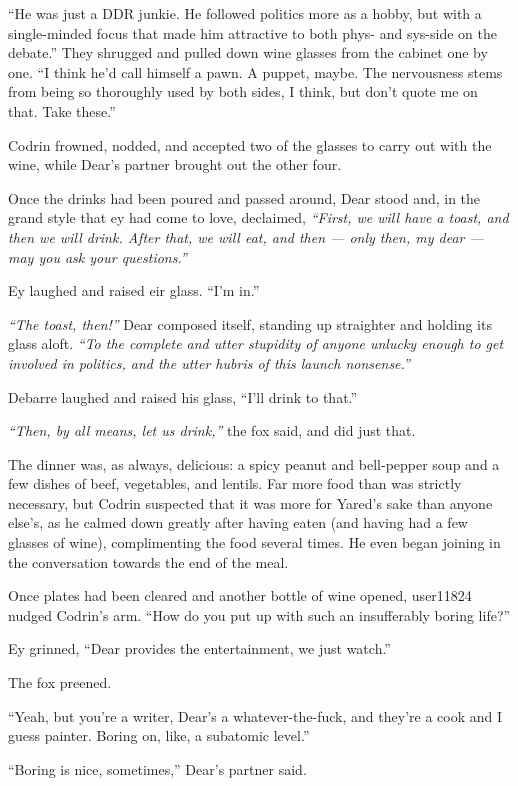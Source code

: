 ``He was just a DDR junkie. He followed politics more as a hobby, but with a single-minded focus that made him attractive to both phys- and sys-side on the debate.'' They shrugged and pulled down wine glasses from the cabinet one by one. ``I think he'd call himself a pawn. A puppet, maybe. The nervousness stems from being so thoroughly used by both sides, I think, but don't quote me on that. Take these.''

Codrin frowned, nodded, and accepted two of the glasses to carry out with the wine, while Dear's partner brought out the other four.

Once the drinks had been poured and passed around, Dear stood and, in the grand style that ey had come to love, declaimed, \emph{``First, we will have a toast, and then we will drink. After that, we will eat, and then — only then, my dear — may you ask your questions.''}

Ey laughed and raised eir glass. ``I'm in.''

\emph{``The toast, then!''} Dear composed itself, standing up straighter and holding its glass aloft. \emph{``To the complete and utter stupidity of anyone unlucky enough to get involved in politics, and the utter hubris of this launch nonsense.''}

Debarre laughed and raised his glass, ``I'll drink to that.''

\emph{``Then, by all means, let us drink,''} the fox said, and did just that.

The dinner was, as always, delicious: a spicy peanut and bell-pepper soup and a few dishes of beef, vegetables, and lentils. Far more food than was strictly necessary, but Codrin suspected that it was more for Yared's sake than anyone else's, as he calmed down greatly after having eaten (and having had a few glasses of wine), complimenting the food several times. He even began joining in the conversation towards the end of the meal.

Once plates had been cleared and another bottle of wine opened, user11824 nudged Codrin's arm. ``How do you put up with such an insufferably boring life?''

Ey grinned, ``Dear provides the entertainment, we just watch.''

The fox preened.

``Yeah, but you're a writer, Dear's a whatever-the-fuck, and they're a cook and I guess painter. Boring on, like, a subatomic level.''

``Boring is nice, sometimes,'' Dear's partner said.

